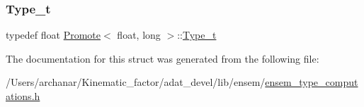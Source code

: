 \subsubsection{\texorpdfstring{Type\_t}{Type\_t}\hspace{0.1cm}{\footnotesize\ttfamily [2/2]}}
{\footnotesize\ttfamily typedef float \mbox{\hyperlink{structPromote}{Promote}}$<$ float, long $>$\+::\mbox{\hyperlink{structPromote_3_01float_00_01long_01_4_a6959e098474512ecba3473c0f5863033}{Type\+\_\+t}}}



The documentation for this struct was generated from the following file\+:\begin{DoxyCompactItemize}
\item 
/\+Users/archanar/\+Kinematic\+\_\+factor/adat\+\_\+devel/lib/ensem/\mbox{\hyperlink{lib_2ensem_2ensem__type__computations_8h}{ensem\+\_\+type\+\_\+computations.\+h}}\end{DoxyCompactItemize}
